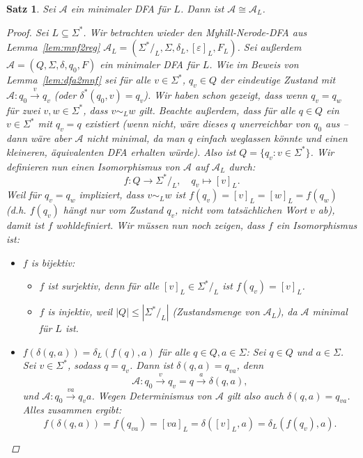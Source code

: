\documentclass[11pt, a4paper]{article}
\theoremstyle{definition}
\theoremstyle{plain}
\newtheorem{theorem}[definition]{Satz}
\numberwithin{equation}{section}
\newcommand{\reaches}[1]{\overset{#1}{\rightarrow}}
\begin{document}
\begin{theorem}\label{thm:mindfaunique}
	Sei $\mathcal{A}$ ein minimaler DFA für $L$. Dann ist $\mathcal{A} \cong \mathcal{A}_L$.
	\begin{proof}
		Sei $L \subseteq \Sigma^\ast$. Wir betrachten wieder den Myhill-Nerode-DFA aus Lemma~\ref{lem:mnf2reg} $\mathcal{A}_L = (\Sigma^\ast/_L, \Sigma, \delta_L, [\varepsilon]_L, F_L)$. Sei außerdem $\mathcal{A} = (Q, \Sigma, \delta, q_0, F)$ ein minimaler DFA für $L$. Wie im Beweis von Lemma~\ref{lem:dfa2mnf} sei für alle $v \in \Sigma^\ast$, $q_v \in Q$ der eindeutige Zustand mit $\mathcal{A}: q_0 \reaches{v} q_v$ (oder $\delta^\ast(q_0, v) = q_v$). Wir haben schon gezeigt, dass wenn $q_v = q_w$ für zwei $v, w \in \Sigma^\ast$, dass $v \sim_L w$ gilt. Beachte außerdem, dass für alle $q \in Q$ ein $v \in \Sigma^\ast$ mit $q_v = q$ existiert (wenn nicht, wäre dieses $q$ unerreichbar von $q_0$ aus -- dann wäre aber $\mathcal{A}$ nicht minimal, da man $q$ einfach weglassen könnte und einen kleineren, äquivalenten DFA erhalten würde). Also ist $Q = \{q_v : v \in \Sigma^\ast\}$. Wir definieren nun einen Isomorphismus von $\mathcal{A}$ auf $\mathcal{A}_L$ durch:
		$$
			f\colon Q \to \Sigma^\ast/_L, \quad q_v \mapsto [v]_L.
		$$
		Weil für $q_v = q_w$ impliziert, dass $v \sim_L w$ ist $f(q_v) = [v]_L = [w]_L = f(q_w)$ (d.h. $f(q_v)$ hängt nur vom Zustand $q_v$, nicht vom tatsächlichen Wort $v$ ab), damit ist $f$ wohldefiniert. Wir müssen nun noch zeigen, dass $f$ ein Isomorphismus ist:
		\begin{itemize}
			\item $f$ is bijektiv:
				\begin{itemize}
					\item $f$ ist surjektiv, denn für alle $[v]_L \in \Sigma^\ast/_L$ ist $f(q_v) = [v]_L$.
					\item $f$ is injektiv, weil $|Q| \leq |\Sigma^\ast/_L|$ (Zustandsmenge von $\mathcal{A}_L$), da $\mathcal{A}$ minimal für $L$ ist.
				\end{itemize}
			\item $f(\delta(q, a)) = \delta_L(f(q), a)$ für alle $q \in Q, a\in \Sigma$: Sei $q \in Q$ und $a \in \Sigma$. Sei $v \in \Sigma^\ast$, sodass $q = q_v$. Dann ist $\delta(q, a) = q_{va}$, denn
				$$
					\mathcal{A}: q_0 \reaches{v} q_v = q \reaches{a} \delta(q, a), 
				$$
				und $\mathcal{A}: q_0 \reaches{va} q_va$. Wegen Determinismus von $\mathcal{A}$ gilt also auch $\delta(q, a) = q_{va}$. Alles zusammen ergibt:
				$$
					f(\delta(q, a)) = f(q_{va}) = [va]_L = \delta([v]_L, a) = \delta_L(f(q_v), a).
$$
\end{itemize}
\end{proof}
\end{theorem}
\end{document}
